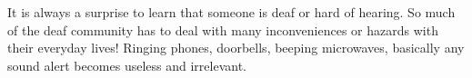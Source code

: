 It is always a surprise to learn that someone is deaf or hard of hearing. So much of the deaf community has to deal with many inconveniences or hazards with their everyday lives! Ringing phones, doorbells, beeping microwaves, basically any sound alert becomes useless and irrelevant.
